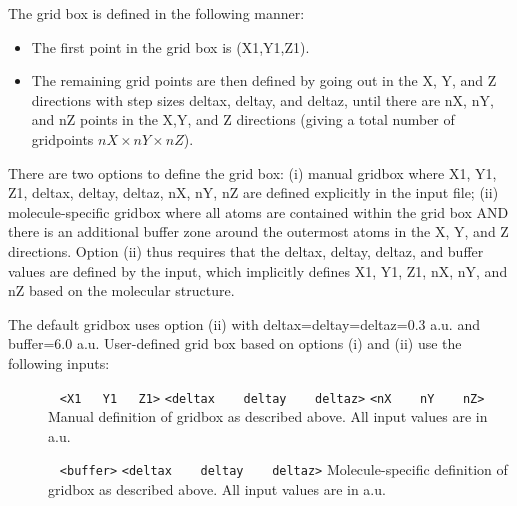 The grid box is defined in the following manner:
\begin{itemize}
\item
The first point in the grid box is (X1,Y1,Z1).                                                 
\item
The remaining grid points are then defined by going out in the X, Y, and Z directions with step sizes deltax, deltay, and deltaz, until there are nX, nY, and nZ points in the X,Y, and Z directions (giving a total number of gridpoints $nX\times nY \times nZ$).      
\end{itemize}

There are two options to define the grid box: (i) manual gridbox where X1, Y1, Z1, deltax, deltay, deltaz, nX, nY, nZ are defined explicitly in the input file; (ii)
molecule-specific gridbox where all atoms are contained within the grid box AND there is an additional buffer zone around the outermost atoms in the X, Y, and Z directions. Option (ii) thus requires that the deltax, deltay, deltaz, and buffer values are defined by the input, which implicitly defines X1, Y1, Z1, nX, nY, and nZ based on the molecular structure.

The default gridbox uses option (ii) with {deltax=deltay=deltaz=0.3 a.u.} and {buffer=6.0 a.u}. 
User-defined grid box based on options (i) and (ii) use the following inputs:


\begin{description}
\item[] \verb| | \newline
\verb|<X1   Y1   Z1>| \newline
\verb|<deltax    deltay    deltaz>| \newline
\verb|<nX    nY    nZ>| \newline
Manual definition of gridbox as described above. All input values are in a.u.

\item[] \verb| | \newline
\verb|<buffer>| \newline
\verb|<deltax    deltay    deltaz>| \newline
Molecule-specific definition of gridbox as described above. All input values are in a.u.

\end{description}

